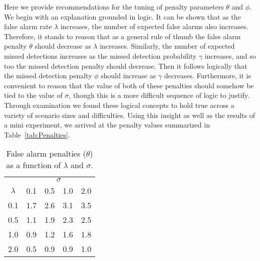 Here we provide recommendations for the tuning of penalty parameters $\theta$ and $\phi$. We begin with an explanation grounded in logic. It can be shown that as the false alarm rate $\lambda$ increases, the number of expected false alarms also increases. Therefore, it stands to reason that as a general rule of thumb the false alarm penalty $\theta$ should decrease as $\lambda$ increases. Similarly, the number of expected missed detections increases as the missed detection probability $\gamma$ increases, and so too the missed detection penalty should decrease. Then it follows logically that the missed detection penalty $\phi$ should increase as $\gamma$ decreases. Furthermore, it is convenient to reason that the value of both of these penalties should somehow be tied to the value of $\sigma$, though this is a more difficult sequence of logic to justify. Through examination we found these logical concepts to hold true across a variety of scenario sizes and difficulties. Using this insight as well as the results of a mini experiment, we arrived at the penalty values summarized in Table~\ref{tab:Penalties}.


\begin{table}[ht]
\centering
\begin{tabular}{c|m{1cm}m{1cm}m{1cm}m{1cm}}
  \hline
   & \multicolumn{4}{c}{$\sigma$} \\
   \cline{2-5}
   $\lambda$ & 0.1 & 0.5 & 1.0 & 2.0\\
  \hline 
   0.1 & 1.7 & 2.6 & 3.1 & 3.5 \\
   0.5 & 1.1 & 1.9 & 2.3 & 2.5 \\ 
   1.0 & 0.9 & 1.2 & 1.6 & 1.8 \\ 
   2.0 & 0.5 & 0.9 & 0.9 & 1.0 \\ 
   \hline
\end{tabular}
\caption{False alarm penalties ($\theta$) as a function of $\lambda$ and $\sigma$.}
\label{tab:Theta_Penalties}
\end{table}


